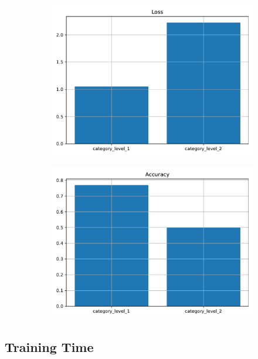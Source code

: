 \begin{figure}[htpb]
	\centering
	\begin{subfigure}{0.48\linewidth}
		\centering
		\includegraphics[width=\linewidth]{Images/final_loss_categories.pdf}
		\caption{}
	\end{subfigure}
	\begin{subfigure}{0.48\linewidth}
		\centering
		\includegraphics[width=\linewidth]{Images/final_accuracy_categories.pdf}
		\caption{}
	\end{subfigure}
	\caption{}
\end{figure}

\subsection{Training Time}

